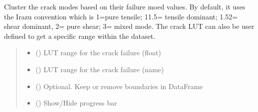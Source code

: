 \documentclass[letterpaper,10pt,english]{sphinxmanual}
\begin{document}
\begin{fulllineitems}
\begin{fulllineitems}
\end{fulllineitems}


\begin{fulllineitems}
\label{\detokenize{pyfdempp:pyfdempp.pyfdempp.Model.crack_failure_mode_clustering}}
\pysigstartsignatures
{}
\pysigstopsignatures
\sphinxAtStartPar
Cluster the crack modes based on their failure moed values. By default, it uses the Irazu convention which is 1=pure tensile; 1\sphinxhyphen{}1.5= tensile dominant; 1.5\sphinxhyphen{}2= shear dominant, 2= pure shear; 3= mixed mode. The crack LUT can also be user defined to get a specific range within the dataset.
\begin{quote}\begin{description}
\begin{itemize}
\item {} 
\sphinxAtStartPar
{} (\sphinxstyleliteralemphasis{\sphinxupquote{{[}}}\sphinxstyleliteralemphasis{\sphinxupquote{{]}}}) \textendash{} LUT range for the crack failure (float)

\item {} 
\sphinxAtStartPar
{} (\sphinxstyleliteralemphasis{\sphinxupquote{{[}}}\sphinxstyleliteralemphasis{\sphinxupquote{{]}}}) \textendash{} LUT range for the crack failure (name)

\item {} 
\sphinxAtStartPar
{} () \textendash{} Optional. Keep or remove boundaries in DataFrame

\item {} 
\sphinxAtStartPar
{} () \textendash{} Show/Hide progress bar


\end{itemize}
\end{description}
\end{quote}
\end{fulllineitems}
\end{fulllineitems}
\end{document}
